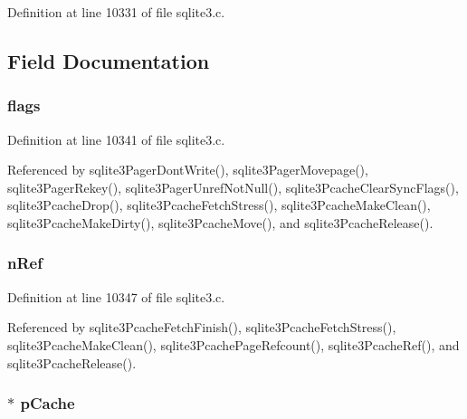 Definition at line 10331 of file sqlite3.\+c.



\subsection{Field Documentation}
\hypertarget{struct_pg_hdr_a687c73b55452210faa467db4d365a3ee}{}
\subsubsection[{flags}]{ flags}\label{struct_pg_hdr_a687c73b55452210faa467db4d365a3ee}


Definition at line 10341 of file sqlite3.\+c.



Referenced by sqlite3\+Pager\+Dont\+Write(), sqlite3\+Pager\+Movepage(), sqlite3\+Pager\+Rekey(), sqlite3\+Pager\+Unref\+Not\+Null(), sqlite3\+Pcache\+Clear\+Sync\+Flags(), sqlite3\+Pcache\+Drop(), sqlite3\+Pcache\+Fetch\+Stress(), sqlite3\+Pcache\+Make\+Clean(), sqlite3\+Pcache\+Make\+Dirty(), sqlite3\+Pcache\+Move(), and sqlite3\+Pcache\+Release().

\hypertarget{struct_pg_hdr_ad9e2b8d24729b14017c69dcbd8f6710a}{}
\subsubsection[{n\+Ref}]{ n\+Ref}\label{struct_pg_hdr_ad9e2b8d24729b14017c69dcbd8f6710a}


Definition at line 10347 of file sqlite3.\+c.



Referenced by sqlite3\+Pcache\+Fetch\+Finish(), sqlite3\+Pcache\+Fetch\+Stress(), sqlite3\+Pcache\+Make\+Clean(), sqlite3\+Pcache\+Page\+Refcount(), sqlite3\+Pcache\+Ref(), and sqlite3\+Pcache\+Release().

\hypertarget{struct_pg_hdr_a0e46130dcee42d121d035a573c45a63d}{}
\subsubsection[{p\+Cache}]{$\ast$ p\+Cache}\label{struct_pg_hdr_a0e46130dcee42d121d035a573c45a63d}


